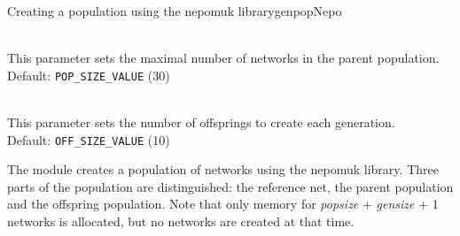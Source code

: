\begin{moduledoc}{Creating a population using the nepomuk library}{genpopNepo}
  \item[\KeyWord{popsize} \optParam{ x } ]~\\
    This parameter sets the maximal number of networks in the parent population.\\
    Default: {\tt POP\_SIZE\_VALUE} (30)
  \item[\KeyWord{gensize} \optParam{ x } ]~\\
    This parameter sets the number of  offsprings to create each generation.\\
    Default: {\tt OFF\_SIZE\_VALUE} (10)
\end{moduledoc}

The module creates a population of networks using the nepomuk library.
Three parts of the population are distinguished: the reference net, the parent
population and the offspring population.
Note that only memory for {\it popsize} + {\it gensize} + 1 networks is allocated,
but no networks are created at that time.


